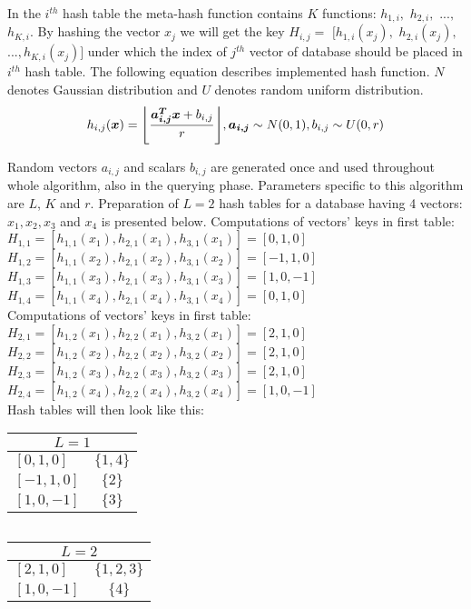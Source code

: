 \par
In the $i^{th}$ hash table the meta-hash function contains $K$ functions: $h_{1,i},$ $h_{2,i},$ $...,$ $h_{K,i}$.
By hashing the vector $x_j$ we will get the key $H_{i,j} = $ $[h_{1,i}(x_j),$ $h_{2,i}(x_j),$
$..., h_{K,i}(x_j)]$ under which the index of $j^{th}$ vector of database should be
placed in $i^{th}$ hash table. The following equation describes implemented hash function.
$N$ denotes Gaussian distribution and $U$ denotes random uniform distribution.
\begin{equation*}
h_{i,j}(\bm{x}) = \floor*{\frac{\bm{a_{i,j}^T x} + b_{i,j}}{r}}, \bm{a_{i,j}} \sim N(0,1), b_{i,j} \sim U(0,r)
\end{equation*}
\par
Random vectors $a_{i,j}$ and scalars $b_{i,j}$ are generated once and used throughout whole
algorithm, also in the querying phase. Parameters specific to this algorithm are $L$, $K$ and $r$.
Preparation of $L = 2$ hash tables for a database having 4 vectors:
$x_1, x_2, x_3$ and $x_4$ is presented below. Computations of vectors' keys in first table:\\
$H_{1,1} = [h_{1,1}(x_1), h_{2,1}(x_1), h_{3,1}(x_1)] = [0, 1, 0]$\\
$H_{1,2} = [h_{1,1}(x_2), h_{2,1}(x_2), h_{3,1}(x_2)] = [-1, 1, 0]$\\
$H_{1,3} = [h_{1,1}(x_3), h_{2,1}(x_3), h_{3,1}(x_3)] = [1, 0, -1]$\\
$H_{1,4} = [h_{1,1}(x_4), h_{2,1}(x_4), h_{3,1}(x_4)] = [0, 1, 0]$\\
Computations of vectors' keys in first table:\\
$H_{2,1} = [h_{1,2}(x_1), h_{2,2}(x_1), h_{3,2}(x_1)] = [2, 1, 0]$\\
$H_{2,2} = [h_{1,2}(x_2), h_{2,2}(x_2), h_{3,2}(x_2)] = [2, 1, 0]$\\
$H_{2,3} = [h_{1,2}(x_3), h_{2,2}(x_3), h_{3,2}(x_3)] = [2, 1, 0]$\\
$H_{2,4} = [h_{1,2}(x_4), h_{2,2}(x_4), h_{3,2}(x_4)] = [1, 0, -1]$\\
Hash tables will then look like this:
\renewcommand{\arraystretch}{1.2}
\begin{center}
\begin{tabular}{|l|c|}
\hline
\multicolumn{2}{|c|}{$L = 1$} \\
\hline
$[0, 1, 0]$ & $\{1, 4\}$ \\
\hline
$[-1, 1, 0]$ & $\{2\}$ \\
\hline
$[1, 0, -1]$ & $\{3\}$ \\
\hline
\end{tabular}
$\ \ \ \ $
\begin{tabular}{|l|c|}
\hline
\multicolumn{2}{|c|}{$L = 2$} \\
\hline
$[2, 1, 0]$ & $\{1, 2, 3\}$ \\
\hline
$[1, 0, -1]$ & $\{4\}$ \\
\hline
\end{tabular}
\end{center}

